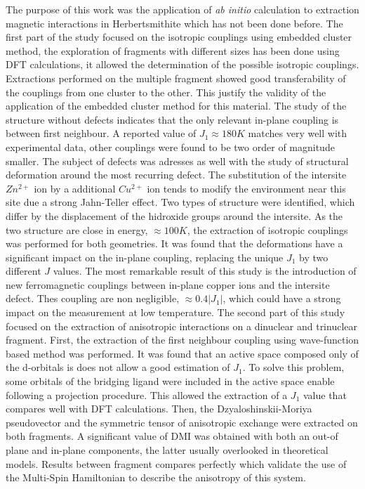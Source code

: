 \documentclass[12pt]{report}
\numberwithin{equation}{section}
\begin{document}
The purpose of this work was the application of \textit{ab initio} calculation to extraction magnetic interactions in Herbertsmithite which has not been done before.
The first part of the study focused on the isotropic couplings using embedded cluster method, the exploration of fragments with different sizes has been done using DFT calculations, it allowed the determination of the possible isotropic couplings.
Extractions performed on the multiple fragment showed good transferability of the couplings from one cluster to the other.
This justify the validity of the application of the embedded cluster method for this material.
The study of the structure without defects indicates that the only relevant in-plane coupling is between first neighbour.
A reported value of $J_1\approx180 K$ matches very well with experimental data, other couplings were found to be two order of magnitude smaller.
The subject of defects was adresses as well with the study of structural deformation around the most recurring defect. 
The substitution of the intersite $Zn^{2+}$ ion by a additional $Cu^{2+}$ ion tends to modify the environment near this site due a strong Jahn-Teller effect.
Two types of structure were identified, which differ by the displacement of the hidroxide groups around the intersite. 
As the two structure are close in energy, $\approx 100 K$, the extraction of isotropic couplings was performed for both geometries.
It was found that the deformations have a significant impact on the in-plane coupling, replacing the unique $J_1$ by two different $J$ values.
The most remarkable result of this study is the introduction of new ferromagnetic couplings between in-plane copper ions and the intersite defect.
Thes coupling are non negligible, $\approx 0.4 |J_1|$, which could have a strong impact on the measurement at low temperature.
The second part of this study focused on the extraction of anisotropic interactions on a dinuclear and trinuclear fragment.
First, the extraction of the first neighbour coupling using wave-function based method was performed. 
It was found that an active space composed only of the d-orbitals is does not allow a good estimation of $J_1$.
To solve this problem, some orbitals of the bridging ligand were included in the active space enable following a projection procedure.
This allowed the extraction of a $J_1$ value that compares well with DFT calculations.
Then, the Dzyaloshinskii-Moriya pseudovector and the symmetric tensor of anisotropic exchange were extracted on both fragments.
A significant value of DMI was obtained with both an out-of plane and in-plane components, the latter usually overlooked in theoretical models. 
Results between fragment compares perfectly which validate the use of the Multi-Spin Hamiltonian to describe the anisotropy of this system.
\end{document}
